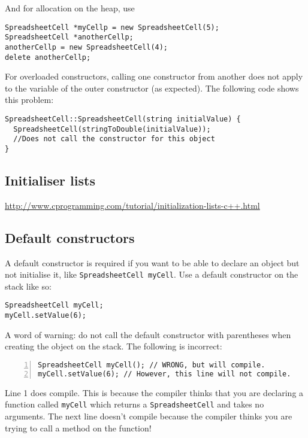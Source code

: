\documentclass[a4paper,12pt]{article}
\begin{document}
And for allocation on the heap, use
\begin{lstlisting}
SpreadsheetCell *myCellp = new SpreadsheetCell(5);
SpreadsheetCell *anotherCellp;
anotherCellp = new SpreadsheetCell(4);
delete anotherCellp;
\end{lstlisting}

For overloaded constructors, calling one constructor from another does not apply to the variable of the outer constructor (as expected). The following code shows this problem:

\begin{lstlisting}
SpreadsheetCell::SpreadsheetCell(string initialValue) {
  SpreadsheetCell(stringToDouble(initialValue));
  //Does not call the constructor for this object
}
\end{lstlisting}

\subsection{Initialiser lists}
\url{http://www.cprogramming.com/tutorial/initialization-lists-c++.html}

\subsection{Default constructors}
A default constructor is required if you want to be able to declare an object but not initialise it, like \lstinline|SpreadsheetCell myCell|. Use a default constructor on the stack like so:

\begin{lstlisting}
SpreadsheetCell myCell;
myCell.setValue(6);
\end{lstlisting}

A word of warning: do not call the default constructor with parentheses when creating the object on the stack. The following is incorrect:

\begin{lstlisting}[numbers=left]
SpreadsheetCell myCell(); // WRONG, but will compile.
myCell.setValue(6); // However, this line will not compile.
\end{lstlisting}

Line 1 does compile. This is because the compiler thinks that you are declaring a function called \lstinline|myCell| which returns a \lstinline|SpreadsheetCell| and takes no arguments. The next line doesn't compile because the compiler thinks you are trying to call a method on the function!

\noindent{}
\end{document}
